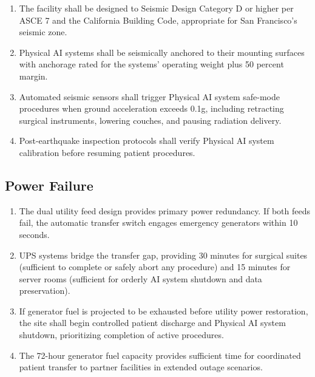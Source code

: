 \begin{enumerate}[label=(\alph*)]
\item The facility shall be designed to Seismic Design Category D or higher
  per ASCE 7 and the California Building Code, appropriate for San Francisco's
  seismic zone.

\item Physical AI systems shall be seismically anchored to their mounting
  surfaces with anchorage rated for the systems' operating weight plus 50
  percent margin.

\item Automated seismic sensors shall trigger Physical AI system safe-mode
  procedures when ground acceleration exceeds 0.1g, including retracting
  surgical instruments, lowering couches, and pausing radiation delivery.

\item Post-earthquake inspection protocols shall verify Physical AI system
  calibration before resuming patient procedures.
\end{enumerate}

\subsection{Power Failure}

\begin{enumerate}[label=(\alph*)]
\item The dual utility feed design provides primary power redundancy. If both
  feeds fail, the automatic transfer switch engages emergency generators
  within 10 seconds.

\item UPS systems bridge the transfer gap, providing 30 minutes for surgical
  suites (sufficient to complete or safely abort any procedure) and 15 minutes
  for server rooms (sufficient for orderly AI system shutdown and data
  preservation).

\item If generator fuel is projected to be exhausted before utility power
  restoration, the site shall begin controlled patient discharge and Physical
  AI system shutdown, prioritizing completion of active procedures.

\item The 72-hour generator fuel capacity provides sufficient time for
  coordinated patient transfer to partner facilities in extended outage
  scenarios.
\end{enumerate}

